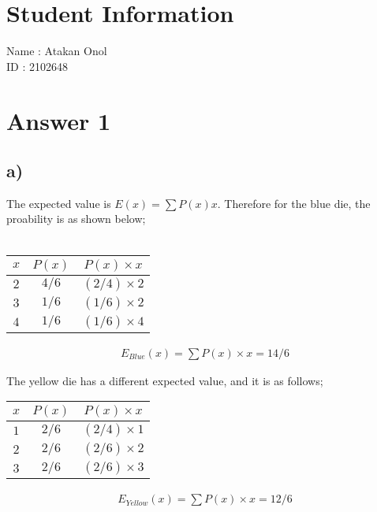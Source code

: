 \documentclass[12pt]{article}
\begin{document}
\section*{Student Information}

Name : Atakan Onol \\

ID : 2102648 \\


\section*{Answer 1}
\subsection*{a)}
The expected value is $E(x) = \sum P(x) x$. Therefore for the blue die, the proability is as shown below; \\ \\
\begin{center}
    \begin{tabular}{ c | c | c}
        $x$ & $P(x)$ & $P(x) \times x$ \\ 
        \hline
        $2$ & $4/6$ & $(2/4) \times 2$ \\
        $3$ & $1/6$ & $(1/6) \times 2$ \\
        $4$ & $1/6$ & $(1/6) \times 4$ \\
    \end{tabular}
\end{center}

\begin{align*}
    E_{Blue}(x) = \sum P(x)\times x = 14/6
\end{align*}


The yellow die has a different expected value, and it is as follows;
\begin{center}
    \begin{tabular}{ c | c | c}
        $x$ & $P(x)$ & $P(x) \times x$ \\ 
        \hline
        $1$ & $2/6$ & $(2/4) \times 1$ \\
        $2$ & $2/6$ & $(2/6) \times 2$ \\
        $3$ & $2/6$ & $(2/6) \times 3$ \\
    \end{tabular}
\end{center}

\begin{align*}
    E_{Yellow}(x) = \sum P(x)\times x = 12/6
\end{align*}
\end{document}
